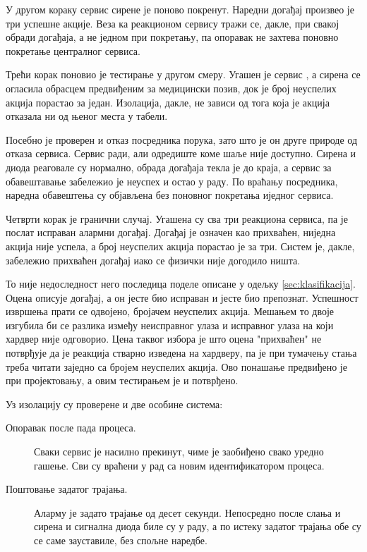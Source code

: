 \documentclass[12pt,oneside]{memoir}
\begin{document}
У другом кораку сервис сирене је поново покренут. Наредни
догађај произвео је три успешне акције. Веза ка реакционом сервису тражи се, дакле, при
свакој обради догађаја, а не једном при покретању, па опоравак не захтева поновно покретање
централног сервиса.

Трећи корак поновио је тестирање у другом смеру. Угашен је сервис
, а сирена се
огласила обрасцем предвиђеним за медицински позив, док је број неуспелих акција порастао за
један. Изолација, дакле, не зависи од тога која је акција отказала ни од њеног места у
табели.

Посебно је проверен и отказ посредника порука, зато што је он друге природе од отказа
сервиса. Сервис ради, али одредиште коме шаље није доступно. Сирена и диода реаговале су
нормално, обрада догађаја текла је до краја, а сервис за обавештавање забележио је неуспех и
остао у раду. По враћању посредника, наредна обавештења су објављена без поновног покретања
иједног сервиса.

Четврти корак је гранични случај. Угашена су сва три реакциона
сервиса, па је послат исправан алармни догађај. Догађај је означен као прихваћен, ниједна
акција није успела, а број неуспелих акција порастао је за три. Систем је, дакле, забележио прихваћен
догађај иако се физички није догодило ништа.

То није недоследност него последица поделе описане у одељку \ref{sec:klasifikacija}. Оцена
описује догађај, а он јесте био исправан и јесте био препознат. Успешност извршења прати
се одвојено, бројачем неуспелих акција. Мешањем то двоје изгубила би се разлика између
неисправног улаза и исправног улаза на који хардвер није одговорио. Цена таквог избора је што оцена 
"прихваћен" не потврђује да је реакција стварно изведена на хардверу, па је при тумачењу стања треба
читати заједно са бројем неуспелих акција. Ово понашање предвиђено је при
пројектовању, а овим тестирањем је и потврђено.

Уз изолацију су проверене и две особине система:

\begin{description}
  \item[Опоравак после пада процеса.] Сваки сервис је насилно прекинут, чиме је заобиђено
        свако уредно гашење. Сви су враћени у рад са новим идентификатором процеса.

  \item[Поштовање задатог трајања.] Аларму је задато трајање од десет секунди. Непосредно
        после слања и сирена и сигнална диода биле су у раду, а по истеку задатог трајања
        обе су се саме зауставиле, без спољне наредбе.
\end{description}
\end{document}
